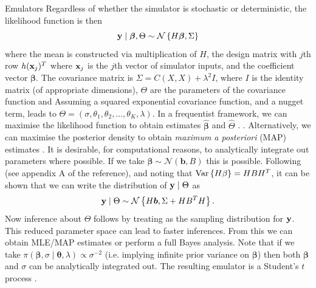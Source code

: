 \begin{chapter}{Emulators \label{Ch:Emulators}}
Regardless of whether the simulator is stochastic or deterministic, the likelihood function is then
\begin{equation}
  \mathbf{y} \mid \bm{\beta}, \Theta \sim \mathcal{N} \left\{ H\bm{\beta}, \Sigma\right\}
\end{equation} where the mean is constructed via multiplication of $H$, the design matrix with $j$th row $h(\mathbf{x}_j)^T$ where $\mathbf{x}_j$ is the $j$th vector of simulator inputs, and the coefficient vector $\bm{\beta}$. The covariance matrix is $\Sigma = C(X, X) + \lambda^2 I$, where $I$ is the identity matrix (of appropriate dimensions), $\Theta$ are the parameters of the covariance function and  Assuming a squared exponential covariance function, and a nugget term, leads to $\Theta = (\sigma, \theta_1, \theta_2, \ldots, \theta_K, \lambda)$.  In a frequentist framework, we can maximise the likelihood function to obtain estimates $\hat{\bm{\beta}}$ and $\hat{\Theta}$ \citep{Sacks89}.  \citep{Svalova2021}. Alternatively,  we can maximise the posterior density to obtain \textit{maximum a posteriori} (MAP) estimates \citep{Baker2020a}. It is desirable, for computational reasons, to analytically integrate out parameters where possible. If we take $\bm{\beta} \sim \mathcal{N}(\bm{b}, B)$ this is possible. Following \citet{BDA3} (see appendix A of the reference), and noting that $\mathrm{Var}\,\{H\beta\} = H B H^T$, it can be shown that we can write the distribution of $\mathbf{y} \mid \Theta$ as
\begin{equation}
  \mathbf{y} \mid \Theta \sim \mathcal{N} \left\{ H \bm{b}, \Sigma + H B^T H\right\}. \label{Eq:int-mean}
\end{equation}
   Now inference about $\Theta$ follows by treating  as the sampling distribution for $\mathbf{y}$. This reduced parameter space can lead to faster inferences. From this we can obtain MLE/MAP estimates or perform a full Bayes analysis. Note that if we take $\pi(\bm{\beta}, \sigma \mid \bm{\theta}, \lambda) \propto \sigma^{-2}$ (i.e. implying infinite prior variance on $\bm{\beta}$) then both $\bm{\beta}$ and $\sigma$ can be analytically integrated out. The resulting emulator is a Student's $t$ process \citep{Oakley2002a}. 

\end{chapter}
